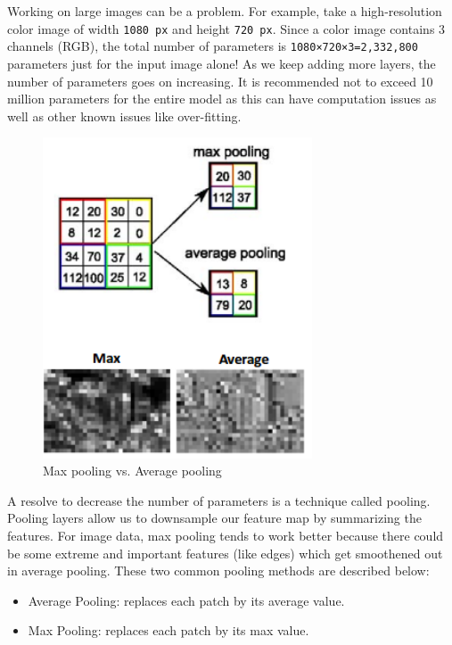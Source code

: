 \documentclass[twocolumn]{article}
\begin{document}
Working on large images can be a problem. For example, take a high-resolution 
color image of width \texttt{1080 px} and height \texttt{720 px}. Since a 
color image contains 3 channels (RGB), the total number of parameters is 
\texttt{1080×720×3=2,332,800} parameters just for the input image alone! As we 
keep adding more layers, the number of parameters goes on increasing. It is 
recommended not to exceed 10 million parameters for the entire model as this 
can have computation issues as well as other known issues like over-fitting.

\begin{figure}[h]
\centering
\includegraphics[width=8cm]{./figures/max pooling vs. average pooling}
\caption{Max pooling vs. Average pooling}
\end{figure}

A resolve to decrease the number of parameters is a technique called pooling. 
Pooling layers allow us to downsample our feature map by summarizing the 
features. For image data, max pooling tends to work better because there could 
be some extreme and important features (like edges) which get smoothened out 
in average pooling. These two common pooling methods are described below: 
\begin{itemize}
  \item Average Pooling: replaces each patch by its average value.
  \item Max Pooling: replaces each patch by its max value.
\end{itemize}
\end{document}
